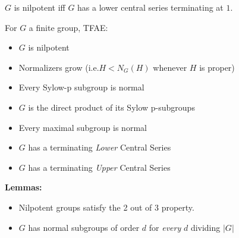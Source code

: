 \begin{theorem}

\(G\) is nilpotent iff \(G\) has a lower central series terminating at
\(1\).

\end{theorem}

\begin{proposition}

For \(G\) a finite group, TFAE:

\begin{itemize}
\tightlist
\item
  \(G\) is nilpotent
\item
  Normalizers grow (i.e.\(H < N_G(H)\) whenever \(H\) is proper)
\item
  Every Sylow-p subgroup is normal
\item
  \(G\) is the direct product of its Sylow p-subgroups
\item
  Every maximal subgroup is normal
\item
  \(G\) has a terminating \emph{Lower} Central Series
\item
  \(G\) has a terminating \emph{Upper} Central Series
\end{itemize}

\end{proposition}

\textbf{Lemmas:}

\begin{itemize}
\tightlist
\item
  Nilpotent groups satisfy the 2 out of 3 property.
\item
  \(G\) has normal subgroups of order \(d\) for \emph{every} \(d\)
  dividing \({\left\lvert {G} \right\rvert}\)
\end{itemize}


\printbibliography[title=Bibliography]



